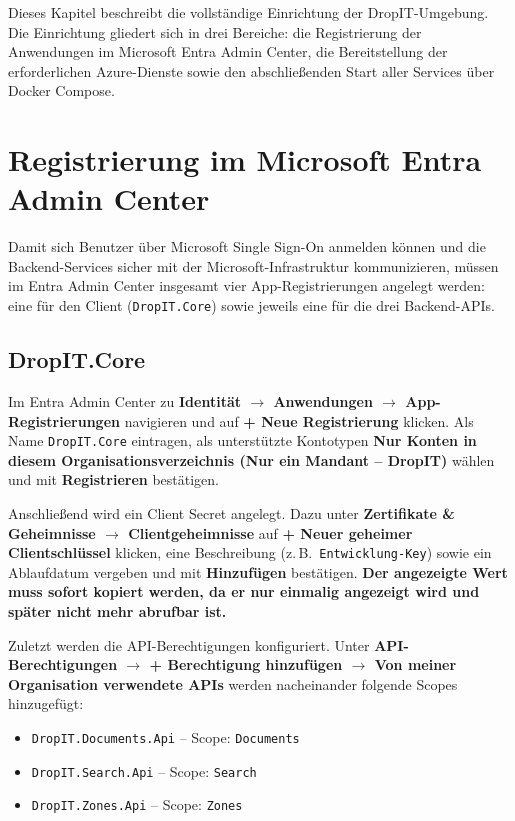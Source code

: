 Dieses Kapitel beschreibt die vollständige Einrichtung der DropIT-Umgebung.
Die Einrichtung gliedert sich in drei Bereiche: die Registrierung der
Anwendungen im Microsoft Entra Admin Center, die Bereitstellung der
erforderlichen Azure-Dienste sowie den abschließenden Start aller Services
über Docker Compose.
 
\section{Registrierung im Microsoft Entra Admin Center}
 
Damit sich Benutzer über Microsoft Single Sign-On anmelden können und die
Backend-Services sicher mit der Microsoft-Infrastruktur kommunizieren,
müssen im Entra Admin Center insgesamt vier App-Registrierungen angelegt
werden: eine für den Client (\texttt{DropIT.Core}) sowie jeweils eine für
die drei Backend-APIs.
 
\subsection{DropIT.Core}
 
Im Entra Admin Center zu \textbf{Identität $\to$ Anwendungen $\to$
App-Registrierungen} navigieren und auf \textbf{+ Neue Registrierung}
klicken. Als Name \texttt{DropIT.Core} eintragen, als unterstützte
Kontotypen \textbf{Nur Konten in diesem Organisationsverzeichnis
(Nur ein Mandant -- DropIT)} wählen und mit \textbf{Registrieren} bestätigen.
 
Anschließend wird ein Client Secret angelegt. Dazu unter
\textbf{Zertifikate \& Geheimnisse $\to$ Clientgeheimnisse} auf
\textbf{+ Neuer geheimer Clientschlüssel} klicken, eine Beschreibung
(z.\,B.\ \texttt{Entwicklung-Key}) sowie ein Ablaufdatum vergeben und mit
\textbf{Hinzufügen} bestätigen. \textbf{Der angezeigte Wert muss sofort
kopiert werden, da er nur einmalig angezeigt wird und später nicht mehr
abrufbar ist.}
 
Zuletzt werden die API-Berechtigungen konfiguriert. Unter
\textbf{API-Berechtigungen $\to$ + Berechtigung hinzufügen $\to$
Von meiner Organisation verwendete APIs} werden nacheinander folgende
Scopes hinzugefügt:
 
\begin{itemize}
    \item \texttt{DropIT.Documents.Api} -- Scope: \texttt{Documents}
    \item \texttt{DropIT.Search.Api} -- Scope: \texttt{Search}
    \item \texttt{DropIT.Zones.Api} -- Scope: \texttt{Zones}
\end{itemize}
 
